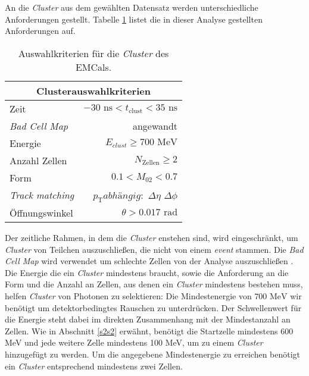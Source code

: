 An die \textit{Cluster} aus dem gewählten Datensatz werden unterschiedliche Anforderungen gestellt.
Tabelle \ref{tab:Cluster} listet die in dieser Analyse gestellten Anforderungen auf.
\begin{table}[b]
\centering
\begin{tabular}{|l|r|}
\hline
\multicolumn{2}{|c|}{Clusterauswahlkriterien}                   \\ \hline \hline
Zeit                    & $-30\text{ ns} < t_\text{clust}<35\text{ ns}$ \\ \hline
\textit{Bad Cell Map}   & angewandt                                     \\ \hline
Energie                 & $E_{clust}\geq700\text{ MeV}$                         \\ \hline
Anzahl Zellen           & $N_\text{Zellen}\geq 2$                       \\ \hline
Form                    & $0.1< M_{02}<0.7$                             \\ \hline
\textit{Track matching} & $p_\text{T} abhängig:$ $\Delta\eta$ $\Delta\phi$                                     \\ \hline
Öffnungswinkel          & $\theta>0.017\text{ rad}$                     \\ \hline
\end{tabular}
\caption{Auswahlkriterien für die \textit{Cluster} des EMCals.}
\label{tab:Cluster}
\end{table}
\newline
Der zeitliche Rahmen, in dem die \textit{Cluster} enstehen sind, wird eingeschränkt, um \textit{Cluster} von Teilchen auszuschließen, die nicht von einem \textit{event} stammen.
Die \textit{Bad Cell Map} wird verwendet um schlechte Zellen von der Analyse auszuschließen \cite{thesis:Joshua}.
\newline
Die Energie die ein \textit{Cluster} mindestens braucht, sowie die Anforderung an die Form und die Anzahl an Zellen, aus denen ein \textit{Cluster} mindestens bestehen muss, helfen \textit{Cluster} von Photonen zu selektieren:
Die Mindestenergie von $700\text{ MeV}$ wir benötigt um detektorbedingtes  Rauschen zu unterdrücken.
Der Schwellenwert für die Energie steht dabei im direkten Zusammenhang mit der Mindestanzahl an Zellen.
Wie in Abschnitt \ref{s2s2} erwähnt, benötigt die Startzelle mindestens 600 MeV und jede weitere Zelle mindestens 100 MeV, um zu einem \textit{Cluster} hinzugefügt zu werden.
Um die angegebene Mindestenergie zu erreichen benötigt ein \textit{Cluster} entsprechend mindestens zwei Zellen.
